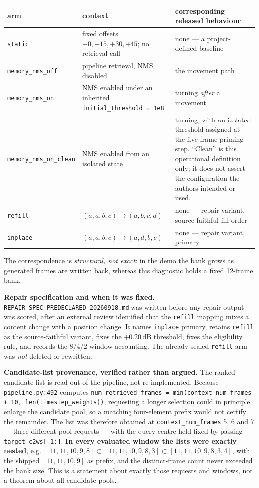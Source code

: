 \documentclass[11pt,a4paper]{article}
\newcommand{\code}[1]{\texttt{\small #1}}
\newcommand{\dB}{\,\mathrm{dB}}
\begin{document}
\begin{center}\small
\begin{tabular}{@{}L{3.3cm}L{4.6cm}L{6.5cm}@{}}
\toprule
arm & context & corresponding released behaviour \\
\midrule
\code{static} & fixed offsets $+0,+15,+30,+45$; no retrieval call & none --- a project-defined baseline \\
\code{memory\_nms\_off} & pipeline retrieval, NMS disabled & the movement path \\
\code{memory\_nms\_on} & NMS enabled under an inherited \code{initial\_threshold = 1e8} & turning \emph{after} a movement \\
\code{memory\_nms\_on\_clean} & NMS enabled from an isolated state & turning, with an isolated threshold assigned at the five-frame priming step. ``Clean'' is this operational definition only; it does not assert the configuration the authors intended or used. \\
\code{refill} & $(a,a,b,c)\to(a,b,c,d)$ & none --- repair variant, source-faithful fill order \\
\code{inplace} & $(a,a,b,c)\to(a,d,b,c)$ & none --- repair variant, primary \\
\bottomrule
\end{tabular}
\end{center}

The correspondence is \emph{structural, not exact}: in the demo the bank grows as generated frames
are written back, whereas this diagnostic holds a fixed 12-frame bank.

\textbf{Repair specification and when it was fixed.} \code{REPAIR\_SPEC\_PREDECLARED\_20260918.md}
was written before any repair output was scored, after an external review identified that the
\code{refill} mapping mixes a content change with a position change. It names \code{inplace}
primary, retains \code{refill} as the source-faithful variant, fixes the $+0.20\dB$ threshold, fixes
the eligibility rule, and records the 8/4/2 window accounting. The already-sealed \code{refill} arm
was \emph{not} deleted or rewritten.

\textbf{Candidate-list provenance, verified rather than argued.} The ranked candidate list is read
out of the pipeline, not re-implemented. Because \code{pipeline.py:492} computes
\code{num\_retrieved\_frames = min(context\_num\_frames + 10, len(timestep\_weights))}, requesting a
longer selection could in principle enlarge the candidate pool, so a matching four-element prefix
would not certify the remainder. The list was therefore obtained at \code{context\_num\_frames}
5, 6 and 7 --- three different pool requests --- with the query centre held fixed by passing
\code{target\_c2ws[-1:]}. \textbf{In every evaluated window the lists were exactly nested}, e.g.\
$[11,11,10,9,8] \subset [11,11,10,9,8,3] \subset [11,11,10,9,8,3,4]$, with the shipped
$[11,11,10,9]$ as prefix, and the distinct-frame count never exceeded the bank size. This is a
statement about exactly those requests and windows, not a theorem about all candidate pools.
\end{document}
